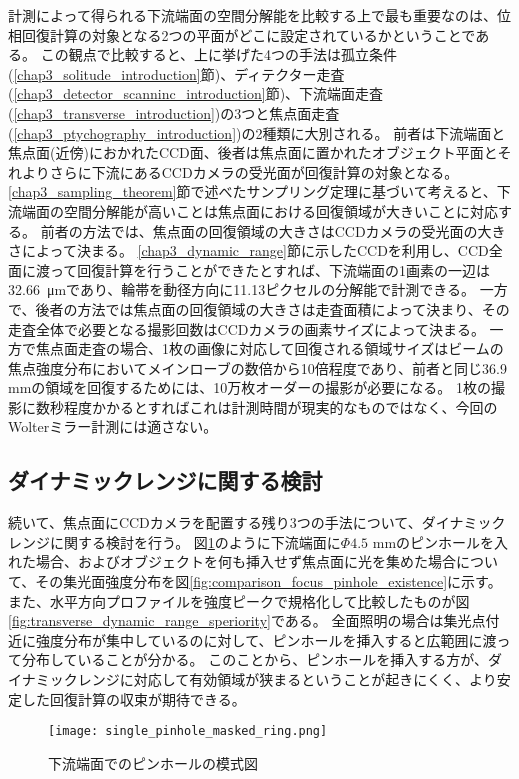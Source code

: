 計測によって得られる下流端面の空間分解能を比較する上で最も重要なのは、位相回復計算の対象となる2つの平面がどこに設定されているかということである。
この観点で比較すると、上に挙げた4つの手法は孤立条件(\ref{chap3_solitude_introduction}節)、ディテクター走査(\ref{chap3_detector_scanninc_introduction}節)、下流端面走査(\ref{chap3_transverse_introduction})の3つと焦点面走査(\ref{chap3_ptychography_introduction})の2種類に大別される。
前者は下流端面と焦点面(近傍)におかれたCCD面、後者は焦点面に置かれたオブジェクト平面とそれよりさらに下流にあるCCDカメラの受光面が回復計算の対象となる。
\ref{chap3_sampling_theorem}節で述べたサンプリング定理に基づいて考えると、下流端面の空間分解能が高いことは焦点面における回復領域が大きいことに対応する。
前者の方法では、焦点面の回復領域の大きさはCCDカメラの受光面の大きさによって決まる。
\ref{chap3_dynamic_range}節に示したCCDを利用し、CCD全面に渡って回復計算を行うことができたとすれば、下流端面の1画素の一辺は\SI{32.66}{\micro \metre}であり、輪帯を動径方向に11.13ピクセルの分解能で計測できる。
一方で、後者の方法では焦点面の回復領域の大きさは走査面積によって決まり、その走査全体で必要となる撮影回数はCCDカメラの画素サイズによって決まる。
一方で焦点面走査の場合、1枚の画像に対応して回復される領域サイズはビームの焦点強度分布においてメインローブの数倍から10倍程度であり、前者と同じ36.9 mmの領域を回復するためには、10万枚オーダーの撮影が必要になる。
1枚の撮影に数秒程度かかるとすればこれは計測時間が現実的なものではなく、今回のWolterミラー計測には適さない。

\subsection{ダイナミックレンジに関する検討}
\label{chap3_comparison_dynamic_range}

続いて、焦点面にCCDカメラを配置する残り3つの手法について、ダイナミックレンジに関する検討を行う。
図\ref{fig:single_pinhole_mask}のように下流端面に$\Phi 4.5$ mmのピンホールを入れた場合、およびオブジェクトを何も挿入せず焦点面に光を集めた場合について、その集光面強度分布を図\ref{fig:comparison_focus_pinhole_existence}に示す。
また、水平方向プロファイルを強度ピークで規格化して比較したものが図\ref{fig:transverse_dynamic_range_speriority}である。
全面照明の場合は集光点付近に強度分布が集中しているのに対して、ピンホールを挿入すると広範囲に渡って分布していることが分かる。
このことから、ピンホールを挿入する方が、ダイナミックレンジに対応して有効領域が狭まるということが起きにくく、より安定した回復計算の収束が期待できる。

\begin{figure}[!ht]
\centering
\texttt{[image: single\_pinhole\_masked\_ring.png]}
\caption{下流端面でのピンホールの模式図}
\label{fig:single_pinhole_mask}
\end{figure}


